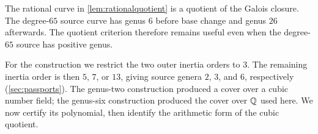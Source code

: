 \begin{remark}
The rational curve in \cref{lem:rationalquotient} is a quotient of the
Galois closure. The degree-$65$ source curve has genus $6$ before base
change and genus $26$ afterwards. The quotient criterion therefore remains
useful even when the degree-$65$ source has positive genus.
\end{remark}

For the construction we restrict the two outer inertia orders to $3$.
The remaining inertia order is then $5$, $7$, or $13$, giving source
genera $2$, $3$, and $6$, respectively (\cref{sec:passports}). The genus-two
construction produced a cover over a cubic number field; the genus-six
construction produced the cover over $\mathbb{Q}$ used here. We now certify its
polynomial, then identify the arithmetic form of the cubic quotient.
